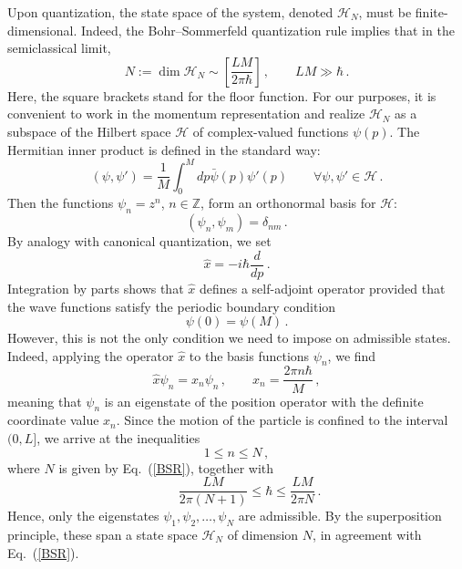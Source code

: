 \documentclass[12pt,a4paper]{article}
\numberwithin{equation}{section}
\theoremstyle{theorem}
\theoremstyle{remark}
\newcommand{\hh}{\mathcal{H}}
\newcommand{\hn}{\mathcal{H}_N}
\begin{document}
Upon quantization, the state space of the system, denoted $\mathcal{H}_N$, must be finite-dimensional. Indeed, the Bohr--Sommerfeld 
quantization rule implies that in the semiclassical limit, 
\begin{equation}\label{BSR}
    N:=\dim \hn \sim \left[ \frac{LM}{2\pi\hbar}\right]\,, \qquad LM\gg \hbar\,. 
\end{equation}
Here, the square brackets stand for the floor function. 
For our purposes, it is convenient to work in the momentum representation and realize $\hn$ as a subspace of the Hilbert space $\hh$ of complex-valued functions $\psi(p)$. The Hermitian inner product is defined in the standard way:
\begin{equation}
    (\psi,\psi')=\frac1M\int_0^Mdp\bar \psi(p)\psi'(p)\qquad \forall \psi,\psi'\in \hh\,.
\end{equation}
Then the functions $\psi_n=z^n$, $n\in \mathbb{Z}$, form an orthonormal basis for $\hh$:
\begin{equation}\label{base}
    (\psi_n,\psi_m)=\delta_{nm}\,.
\end{equation}
By analogy with canonical quantization, we set
\begin{equation}
    \hat{x}=-i\hbar\frac{d}{d p}\,.
\end{equation}
Integration by parts shows that $\hat{x}$ defines a self-adjoint operator provided that the wave functions satisfy the periodic boundary condition 
\begin{equation}\label{PBC}
    \psi(0)=\psi(M)\,.
\end{equation}
However, this is not the only condition we need to impose on admissible states. Indeed, applying the operator $\hat x$ to the basis functions $\psi_n$, we find 
\begin{equation}
    \hat{x}\psi_n=x_n\psi_n\,,\qquad x_n=\frac{2\pi n\hbar}{M}\,,
    \end{equation}
meaning that $\psi_n$ is an eigenstate of the position operator with the definite coordinate value $x_n$. Since the motion of the particle is confined to the interval $(0, L]$, we arrive at  the inequalities
\begin{equation}
    1\leq n\leq N\,, 
\end{equation}
where $N$ is given by Eq.~(\ref{BSR}), together with
\begin{equation}
    \qquad\frac{LM}{2\pi (N+1)}\leq \hbar \leq \frac{LM}{2\pi N}\,.\end{equation}
Hence, only  the eigenstates $\psi_1,\psi_2,\ldots, \psi_{N}$ are admissible. By the superposition principle, these span a state space $\hn$ of dimension $N$, in agreement with Eq.~(\ref{BSR}). 
\end{document}
